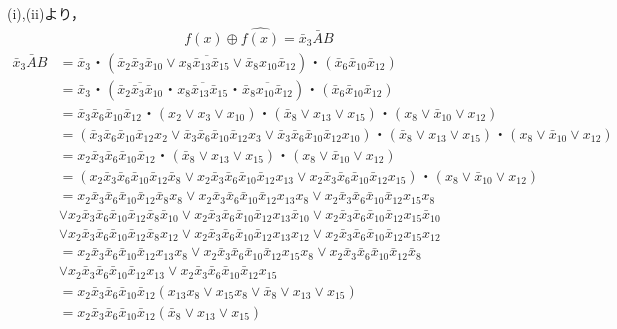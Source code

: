 \documentclass[dvipdfmx,a4paper,12pt]{jsarticle}
\begin{document}
(i),(ii)より，
\begin{gather*}
f(x) \oplus \hat{f(x)} =  \bar{x}_{3}\bar{A}B 
\end{gather*}  
\begin{align*}
 \bar{x}_{3}\bar{A}B &= \bar{x}_{3}・(\overline{\bar{x}_{2}\bar{x}_{3}\bar{x}_{10}\lor x_{8}\bar{x}_{13}\bar{x}_{15}\lor \bar{x}_{8}x_{10}\bar{x}_{12}})・(\bar{x}_{6}\bar{x}_{10}\bar{x}_{12}) \\
 & = \bar{x}_{3}・(\overline{\bar{x}_{2}\bar{x}_{3}\bar{x}_{10}}・ \overline{x_{8}\bar{x}_{13}\bar{x}_{15}}・ \overline{\bar{x}_{8}x_{10}\bar{x}_{12}})・(\bar{x}_{6}\bar{x}_{10}\bar{x}_{12}) \\
 & = \bar{x}_{3}\bar{x}_{6}\bar{x}_{10}\bar{x}_{12}・(x_{2} \lor x_{3} \lor x_{10})・(\bar{x}_{8} \lor x_{13} \lor x_{15})・(x_{8} \lor \bar{x}_{10} \lor x_{12}) \\
 & = (\bar{x}_{3}\bar{x}_{6}\bar{x}_{10}\bar{x}_{12}x_{2} \lor \bar{x}_{3}\bar{x}_{6}\bar{x}_{10}\bar{x}_{12}x_{3} \lor \bar{x}_{3}\bar{x}_{6}\bar{x}_{10}\bar{x}_{12}x_{10})・(\bar{x}_{8} \lor x_{13} \lor x_{15})・(x_{8} \lor \bar{x}_{10} \lor x_{12}) \\
& = x_{2} \bar{x}_{3}\bar{x}_{6}\bar{x}_{10}\bar{x}_{12}・(\bar{x}_{8} \lor x_{13} \lor x_{15})・(x_{8} \lor \bar{x}_{10} \lor x_{12}) \\
& = (x_{2} \bar{x}_{3}\bar{x}_{6}\bar{x}_{10}\bar{x}_{12}\bar{x}_{8} \lor x_{2} \bar{x}_{3}\bar{x}_{6}\bar{x}_{10}\bar{x}_{12}x_{13} \lor x_{2} \bar{x}_{3}\bar{x}_{6}\bar{x}_{10}\bar{x}_{12}x_{15})・(x_{8} \lor \bar{x}_{10} \lor x_{12}) \\
& = x_{2}\bar{x}_{3}\bar{x}_{6}\bar{x}_{10}\bar{x}_{12}\bar{x}_{8}x_{8} \lor x_{2} \bar{x}_{3}\bar{x}_{6}\bar{x}_{10}\bar{x}_{12}x_{13}x_{8} \lor x_{2} \bar{x}_{3}\bar{x}_{6}\bar{x}_{10}\bar{x}_{12}x_{15}x_{8}  \\
 & \lor x_{2} \bar{x}_{3}\bar{x}_{6}\bar{x}_{10}\bar{x}_{12}\bar{x}_{8}\bar{x}_{10} \lor x_{2} \bar{x}_{3}\bar{x}_{6}\bar{x}_{10}\bar{x}_{12}x_{13}\bar{x}_{10} \lor x_{2} \bar{x}_{3}\bar{x}_{6}\bar{x}_{10}\bar{x}_{12}x_{15}\bar{x}_{10} \\
 &  \lor x_{2} \bar{x}_{3}\bar{x}_{6}\bar{x}_{10}\bar{x}_{12}\bar{x}_{8}x_{12} \lor x_{2} \bar{x}_{3}\bar{x}_{6}\bar{x}_{10}\bar{x}_{12}x_{13}x_{12} \lor x_{2} \bar{x}_{3}\bar{x}_{6}\bar{x}_{10}\bar{x}_{12}x_{15}x_{12} \\
 & =   x_{2} \bar{x}_{3}\bar{x}_{6}\bar{x}_{10}\bar{x}_{12}x_{13}x_{8} \lor x_{2} \bar{x}_{3}\bar{x}_{6}\bar{x}_{10}\bar{x}_{12}x_{15}x_{8}  \lor x_{2} \bar{x}_{3}\bar{x}_{6}\bar{x}_{10}\bar{x}_{12}\bar{x}_{8} \\
 &  \lor x_{2} \bar{x}_{3}\bar{x}_{6}\bar{x}_{10}\bar{x}_{12}x_{13} \lor x_{2} \bar{x}_{3}\bar{x}_{6}\bar{x}_{10}\bar{x}_{12}x_{15} \\
 & =   x_{2}\bar{x}_{3}\bar{x}_{6}\bar{x}_{10}\bar{x}_{12}(x_{13}x_{8} \lor x_{15}x_{8}  \lor \bar{x}_{8} \lor x_{13} \lor x_{15}) \\
 & =   x_{2}\bar{x}_{3}\bar{x}_{6}\bar{x}_{10}\bar{x}_{12}(\bar{x}_{8} \lor x_{13} \lor x_{15}) \\
 \end{align*}  
\end{document}

